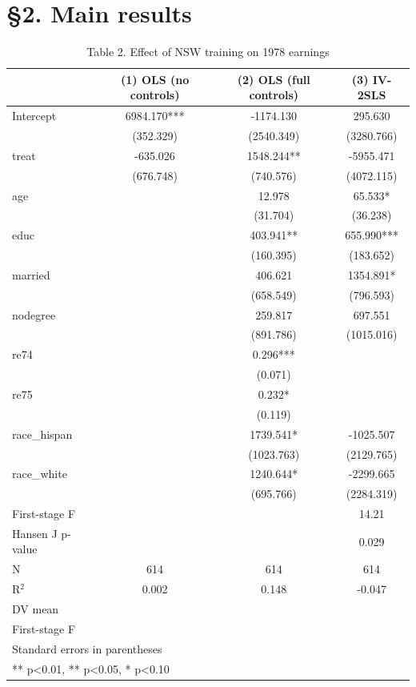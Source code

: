\section{§2. Main results}

\begin{table}[htbp]
\centering
\caption{Table 2. Effect of NSW training on 1978 earnings}
\begin{tabular}{lccc}
\hline\hline
 & (1) OLS (no controls) & (2) OLS (full controls) & (3) IV-2SLS \\
\hline
Intercept & 6984.170*** & -1174.130 & 295.630 \\
 & (352.329) & (2540.349) & (3280.766) \\
treat & -635.026 & 1548.244** & -5955.471 \\
 & (676.748) & (740.576) & (4072.115) \\
age &  & 12.978 & 65.533* \\
 &  & (31.704) & (36.238) \\
educ &  & 403.941** & 655.990*** \\
 &  & (160.395) & (183.652) \\
married &  & 406.621 & 1354.891* \\
 &  & (658.549) & (796.593) \\
nodegree &  & 259.817 & 697.551 \\
 &  & (891.786) & (1015.016) \\
re74 &  & 0.296*** &  \\
 &  & (0.071) &  \\
re75 &  & 0.232* &  \\
 &  & (0.119) &  \\
race\_hispan &  & 1739.541* & -1025.507 \\
 &  & (1023.763) & (2129.765) \\
race\_white &  & 1240.644* & -2299.665 \\
 &  & (695.766) & (2284.319) \\
\hline
First-stage F &  &  & 14.21 \\
Hansen J p-value &  &  & 0.029 \\
\hline
N & 614 & 614 & 614 \\
R$^2$ & 0.002 & 0.148 & -0.047 \\
DV mean &  &  &  \\
First-stage F &  &  &  \\
\hline\hline
\multicolumn{4}{l}{\footnotesize Standard errors in parentheses} \\
\multicolumn{4}{l}{\footnotesize *** p<0.01, ** p<0.05, * p<0.10} \\
\end{tabular}
\end{table}

